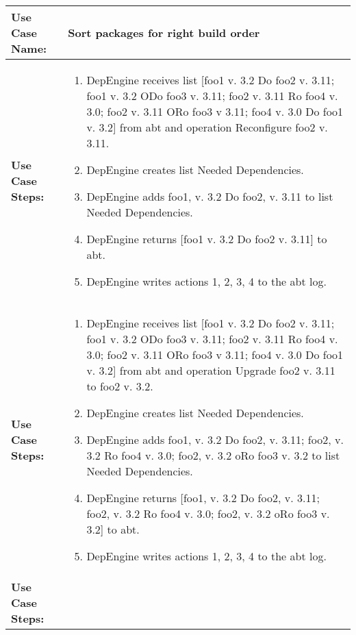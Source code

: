 \begin{tabularx}{\linewidth}{|l|X|}
\hline
\textbf{Use Case Name:} & \textbf{Sort packages for right build order} \\
\hline
\textbf{Use Case Steps:} & 
\begin{minipage}{\linewidth} 
  \vspace{0.05em}
  \begin{enumerate}
  \item DepEngine receives list [foo1 v. 3.2 Do foo2 v. 3.11; foo1 v. 3.2 ODo foo3 v. 3.11; foo2 v. 3.11 Ro foo4 v. 3.0; foo2 v. 3.11 ORo foo3 v 3.11; foo4 v. 3.0 Do foo1 v. 3.2] from abt and operation Reconfigure foo2 v. 3.11.
  \item DepEngine creates list Needed Dependencies.
  \item DepEngine adds foo1, v. 3.2 Do foo2, v. 3.11 to list Needed Dependencies.
  \item DepEngine returns [foo1 v. 3.2 Do foo2 v. 3.11] to abt.
  \item DepEngine writes actions 1, 2, 3, 4 to the abt log.
    \end{enumerate}
  \vspace{0.05em}
\end{minipage}
\\
\hline 
\textbf{Use Case Steps:} & 
\begin{minipage}{\linewidth} 
  \vspace{0.05em}
  \begin{enumerate}
  \item DepEngine receives list [foo1 v. 3.2 Do foo2 v. 3.11; foo1 v. 3.2 ODo foo3 v. 3.11; foo2 v. 3.11 Ro foo4 v. 3.0; foo2 v. 3.11 ORo foo3 v 3.11; foo4 v. 3.0 Do foo1 v. 3.2] from abt and operation Upgrade foo2 v. 3.11 to foo2 v. 3.2.
  \item DepEngine creates list Needed Dependencies.
  \item DepEngine adds foo1, v. 3.2 Do foo2, v. 3.11; foo2, v. 3.2 Ro foo4 v. 3.0; foo2, v. 3.2 oRo foo3 v. 3.2 to list Needed Dependencies.
  \item DepEngine returns [foo1, v. 3.2 Do foo2, v. 3.11; foo2, v. 3.2 Ro foo4 v. 3.0; foo2, v. 3.2 oRo foo3 v. 3.2] to abt.
  \item DepEngine writes actions 1, 2, 3, 4 to the abt log.
    \end{enumerate}
  \vspace{0.05em}
\end{minipage}
\\
\hline 
\textbf{Use Case Steps:} & 

\end{tabularx}
